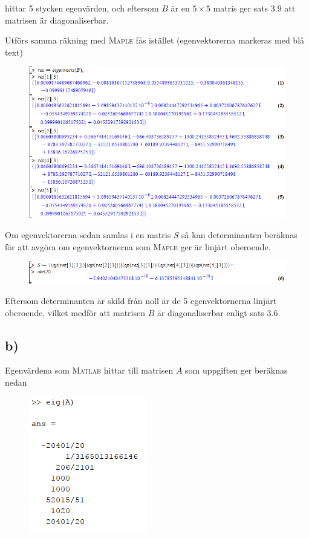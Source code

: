 \documentclass[a4paper]{article}
\newcommand{\mat}[1]{\bm{\mathit{#1}}}
\begin{document}
\noindent {} hittar 5 stycken egenvärden, och eftersom $\mat{B}$ är en
$5\times 5$ matris ger sats 3.9 att matrisen är diagonaliserbar.

Utförs samma räkning med \textsc{Maple} fås istället (egenvektorerna markeras
med blå text)

\FloatBarrier
\begin{figure}[h!]
  \centering
  \includegraphics[width=\linewidth]{figurer/maple_1_2_a1.png}
\end{figure}
\FloatBarrier

\noindent Om egenvektorerna sedan samlas i en matris $\mat{S}$ så kan
determinanten beräknas för att avgöra om egenvektornerna som \textsc{Maple} ger
är linjärt oberoende.

\FloatBarrier
\begin{figure}[h!]
  \centering
  \includegraphics[width=\linewidth]{figurer/maple_1_2_a2.png}
\end{figure}
\FloatBarrier

\noindent Eftersom  determinanten är skild från noll är de 5 egenvektornerna linjärt
oberoende, vilket medför att matrisen $\mat{B}$ är diagonaliserbar enligt sats 3.6.

\subsection*{b)}

Egenvärdena som \textsc{Matlab} hittar till matrisen $\mat{A}$ som uppgiften ger
beräknas nedan

\FloatBarrier
\begin{figure}[h!]
  \centering
  \includegraphics[width=0.35\linewidth]{figurer/matlab_1_2_b.png}
\end{figure}
\FloatBarrier
\end{document}
